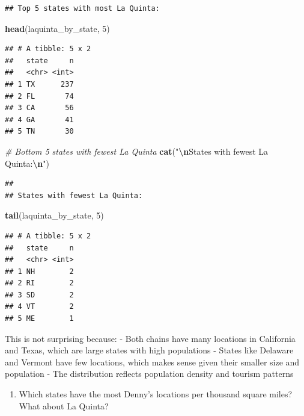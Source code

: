 \documentclass[
]{article}
\newenvironment{Shaded}{\begin{snugshade}}{\end{snugshade}}
\newcommand{\CommentTok}[1]{\textcolor[rgb]{0.56,0.35,0.01}{\textit{#1}}}
\newcommand{\DecValTok}[1]{\textcolor[rgb]{0.00,0.00,0.81}{#1}}
\newcommand{\FunctionTok}[1]{\textcolor[rgb]{0.13,0.29,0.53}{\textbf{#1}}}
\newcommand{\NormalTok}[1]{#1}
\newcommand{\SpecialCharTok}[1]{\textcolor[rgb]{0.81,0.36,0.00}{\textbf{#1}}}
\newcommand{\StringTok}[1]{\textcolor[rgb]{0.31,0.60,0.02}{#1}}
\providecommand{\tightlist}{%
  \setlength{\itemsep}{0pt}\setlength{\parskip}{0pt}}
\begin{document}
\begin{verbatim}
## Top 5 states with most La Quinta:
\end{verbatim}

\begin{Shaded}
\begin{Highlighting}[]
\FunctionTok{head}\NormalTok{(laquinta\_by\_state, }\DecValTok{5}\NormalTok{)}
\end{Highlighting}
\end{Shaded}

\begin{verbatim}
## # A tibble: 5 x 2
##   state     n
##   <chr> <int>
## 1 TX      237
## 2 FL       74
## 3 CA       56
## 4 GA       41
## 5 TN       30
\end{verbatim}

\begin{Shaded}
\begin{Highlighting}[]
\CommentTok{\# Bottom 5 states with fewest La Quinta}
\FunctionTok{cat}\NormalTok{(}\StringTok{"}\SpecialCharTok{\textbackslash{}n}\StringTok{States with fewest La Quinta:}\SpecialCharTok{\textbackslash{}n}\StringTok{"}\NormalTok{)}
\end{Highlighting}
\end{Shaded}

\begin{verbatim}
## 
## States with fewest La Quinta:
\end{verbatim}

\begin{Shaded}
\begin{Highlighting}[]
\FunctionTok{tail}\NormalTok{(laquinta\_by\_state, }\DecValTok{5}\NormalTok{)}
\end{Highlighting}
\end{Shaded}

\begin{verbatim}
## # A tibble: 5 x 2
##   state     n
##   <chr> <int>
## 1 NH        2
## 2 RI        2
## 3 SD        2
## 4 VT        2
## 5 ME        1
\end{verbatim}

This is not surprising because: - Both chains have many locations in
California and Texas, which are large states with high populations -
States like Delaware and Vermont have few locations, which makes sense
given their smaller size and population - The distribution reflects
population density and tourism patterns

\begin{enumerate}
\def\labelenumi{\arabic{enumi}.}
\setcounter{enumi}{9}
\tightlist
\item
  Which states have the most Denny's locations per thousand square
  miles? What about La Quinta?
\end{enumerate}
\end{document}
